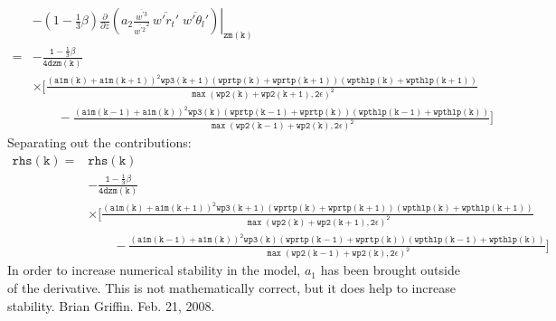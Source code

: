 \documentclass[11pt,fleqn]{article}
\newcommand{\ptlder}[2]{\frac{\partial #1}{\partial #2}}
\begin{document}
\begin{equation}
\begin{split}
& - \left. \left( 1 - \frac{1}{3}\beta \right)
       \ptlder{}{z}
         \left( 
           a_2
           \frac{\overline{w^{'3}}}{\overline{w^{'2}}^2} \,
           \overline{w'r_t'} \; \overline{w'\theta_l'}
         \right) \right|_{\mathtt{zm(k)}} \\
=& \mathtt{
   - \frac{1 - \frac{1}{3}\beta}{4 dzm(k)} } \\
 & \mathtt{
     \times \bigg[ \frac{\left(a1m(k)+a1m(k+1)\right)^2 wp3(k+1) 
                  \left(wprtp(k)+wprtp(k+1)\right)\left(wpthlp(k)+wpthlp(k+1)\right)}
                 {\max\left(wp2(k)+wp2(k+1),2\epsilon\right)^2} } \\
 & \mathtt{ \quad \quad
           -\frac{\left(a1m(k-1)+a1m(k)\right)^2 wp3(k) 
                  \left(wprtp(k-1)+wprtp(k)\right)\left(wpthlp(k-1)+wpthlp(k)\right)}
                 {\max\left(wp2(k-1)+wp2(k),2\epsilon\right)^2}
     \bigg]
   }
\end{split}
\end{equation}
%
Separating out the contributions:
%
\begin{equation}
\begin{split}
\mathtt{rhs(k)} =& \mathtt{rhs(k)} \\
 & \mathtt{ - \frac{1 - \frac{1}{3}\beta}{4 dzm(k)} } \\
 & \mathtt{ \times 
      \bigg[ \frac{\left(a1m(k)+a1m(k+1)\right)^2 wp3(k+1) 
                   \left(wprtp(k)+wprtp(k+1)\right) 
                   \left(wpthlp(k)+wpthlp(k+1)\right)}
                  {\max\left(wp2(k)+wp2(k+1),2\epsilon\right)^2} } \\
 & \mathtt{ \quad \quad
            -\frac{\left(a1m(k-1)+a1m(k)\right)^2 wp3(k) 
                   \left(wprtp(k-1)+wprtp(k)\right) 
                   \left(wpthlp(k-1)+wpthlp(k)\right)}
                  {\max\left(wp2(k-1)+wp2(k),2\epsilon\right)^2}
      \bigg]
   }
\end{split}
\end{equation}
%
In order to increase numerical stability in the model, $a_{1}$ has been brought
outside of the derivative.  This is not mathematically correct, but it does 
help to increase stability.  Brian Griffin.  Feb. 21, 2008.
% 
\end{document}
